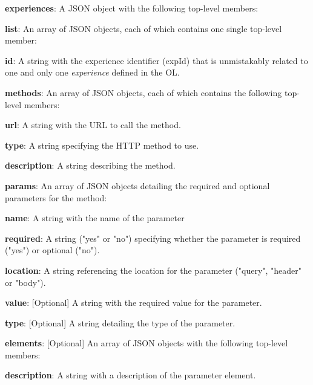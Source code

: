 \begin{myEnumerate}
    \item \textbf{experiences}: A JSON object with the following top-level members:
    \begin{myEnumerate}
        \item \textbf{list}: An array of JSON objects, each of which contains one single top-level member:
        \begin{myEnumerate}
            \item \textbf{id}: A string with the experience identifier (expId) that is unmistakably related to one and only one \textit{experience} defined in the OL.
        \end{myEnumerate}
        \item \textbf{methods}: An array of JSON objects, each of which contains the following top-level members:
        \begin{myEnumerate}
            \item \textbf{url}: A string with the URL to call the method.
            \item \textbf{type}: A string specifying the HTTP method to use.
            \item \textbf{description}: A string describing the method.
            \item \textbf{params}: An array of JSON objects detailing the required and optional parameters for the method:
            \begin{myEnumerate}
                \item \textbf{name}: A string with the name of the parameter
                \item \textbf{required}: A string ("yes" or "no") specifying whether the parameter is required ("yes") or optional ("no").
                \item \textbf{location}: A string referencing the location for the parameter ("query", "header" or "body").
                \item \textbf{value}: [Optional] A string with the required value for the parameter.
                \item \textbf{type}: [Optional] A string detailing the type of the parameter.
                \item \textbf{elements}: [Optional] An array of JSON objects with the following top-level members:
                \begin{myEnumerate}
                    \item \textbf{description}: A string with a description of the parameter element.

\end{myEnumerate}
\end{myEnumerate}
\end{myEnumerate}
\end{myEnumerate}
\end{myEnumerate}
